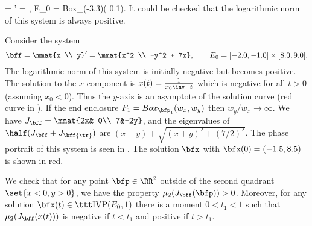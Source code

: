 {\begin{Example}
    \end{Example}

    \begin{Example}
			\bff= '
			=  ,
                    \qquad E_0 = Box_{(-3,3)}( 0.1).
			\eeql
		It could be checked that the logarithmic norm of this system is
		always positive.

	\end{Example}
	
	\begin{Example}[ 3.]
		Consider the system  
		\[
		\bff=\mmat{x \\ y} '
		= \mmat{x^2 \\ -y^2 + 	7x} , 
            \qquad E_0 = [-2.0, -1.0] \times [8.0, 9.0].
		\]
		The logarithmic norm of this system is initially negative but
		becomes positive. The solution to the $x$-component is $x(t)=
		\tfrac{1}{x_0\inv -t}$ which is negative for all $t>0$ (assuming
		$x_0<0$). Thus the $y$-axis is an asymptote of the solution curve
		(red curve in ). If the end enclosure
		$F_1=Box_{\bfp_1}(w_x, w_y)$ then $w_y/w_x\to \infty$. We have
		$J_\bff=\mmat{2x& 0\\ 7&-2y}$, and the eigenvalues of
		$\half(J_\bff+J_\bff{\tr})$ are
        $(x-y) + \sqrt{(x+y)^2 + (7/2)^2}$.
		        The phase portrait of this system is seen in
		. The solution
		$\bfx$ with $\bfx(0)=(-1.5, 8.5)$ is shown in red.
	
	
    We check that for any point $\bfp\in\RR^2$ outside
    of the second quadrant $\set{x<0, y>0}$, we have
    the property
    $\mu_2(J_\bff(\bfp))>0$.   Moreover, for
     any solution $\bfx(t)\in \ivp(E_0,1)$ there is a moment 
        $0< t_1<1$ such that
        $\mu_2(J_\bff(x(t)))$ is negative if $t<t_1$
        and positive if $t>t_1$.  
	\end{Example}

}
